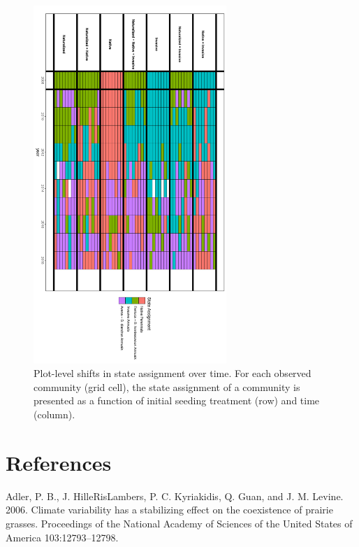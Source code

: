 \documentclass[twoside,12pt,final]{ucthesis-CA2012}
\begin{document}
\begin{ucmainmatter}
\begin{figure}
\includegraphics[width=0.65\textwidth,height=0.8\textheight]{figure/AppFig3_3.png}
\caption{Plot-level shifts in state assignment over time. For each observed community (grid cell), the state assignment of a community is presented as a function of initial seeding treatment (row) and time (column). \label{app-3-3}}
\end{figure}
\backmatter

\hypertarget{references}{%
\chapter*{References}\label{references}}


\noindent

\setlength{\parindent}{-0.20in}
\setlength{\leftskip}{0.20in}
\setlength{\parskip}{8pt}

\hypertarget{refs}{}
\leavevmode\hypertarget{ref-Adler2006}{}%
Adler, P. B., J. HilleRisLambers, P. C. Kyriakidis, Q. Guan, and J. M. Levine. 2006. Climate variability has a stabilizing effect on the coexistence of prairie grasses. Proceedings of the National Academy of Sciences of the United States of America 103:12793--12798.


\end{ucmainmatter}
\end{document}
